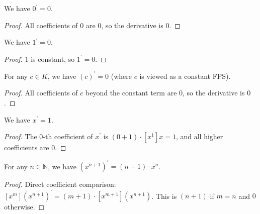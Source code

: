 \begin{lemma}
\label{lem.fps.deriv.zero}
\leanhelper
\leanok
We have $0^{\prime} = 0$.
\end{lemma}

\begin{proof}
\leanok
All coefficients of $0$ are $0$, so the derivative is $0$.
\end{proof}

\begin{lemma}
\label{lem.fps.deriv.one}
\leanhelper
\leanok
We have $1^{\prime} = 0$.
\end{lemma}

\begin{proof}
\leanok
$1$ is constant, so $1^{\prime} = 0$.
\end{proof}

\begin{lemma}
\label{lem.fps.deriv.C}
\leanhelper
\leanok
For any $c\in K$, we have $(c)^{\prime} = 0$
(where $c$ is viewed as a constant FPS).
\end{lemma}

\begin{proof}
\leanok
All coefficients of $c$ beyond the constant term are $0$, so the derivative is $0$.
\end{proof}

\begin{lemma}
\label{lem.fps.deriv.X}
\leanhelper
\leanok
We have $x^{\prime} = 1$.
\end{lemma}

\begin{proof}
\leanok
The $0$-th coefficient of $x^{\prime}$ is $(0+1) \cdot [x^1]x = 1$, and
all higher coefficients are $0$.
\end{proof}

\begin{lemma}
\label{lem.fps.deriv.X-pow-succ}
\leanhelper
\leanok
For any $n\in\mathbb{N}$, we have
$\left(x^{n+1}\right)^{\prime} = (n+1) \cdot x^{n}$.
\end{lemma}

\begin{proof}
\leanok
Direct coefficient comparison: $[x^m](x^{n+1})^{\prime} = (m+1) \cdot [x^{m+1}](x^{n+1})$.
This is $(n+1)$ if $m = n$ and $0$ otherwise.
\end{proof}

